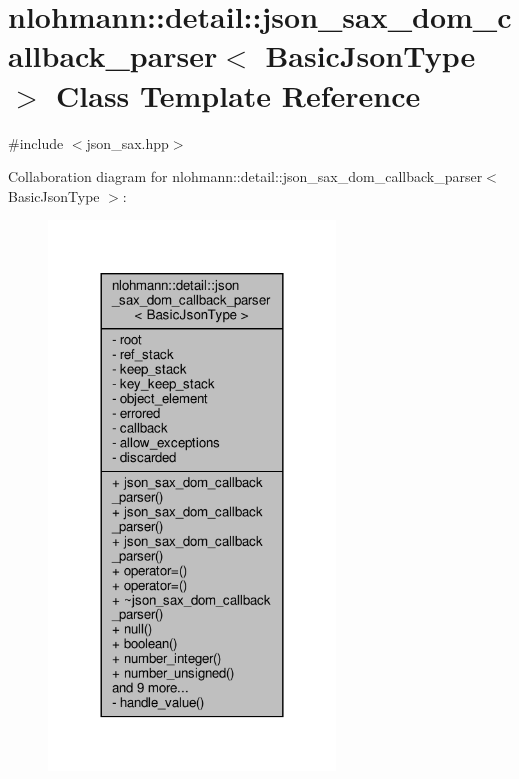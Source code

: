 \hypertarget{classnlohmann_1_1detail_1_1json__sax__dom__callback__parser}{}\section{nlohmann\+:\+:detail\+:\+:json\+\_\+sax\+\_\+dom\+\_\+callback\+\_\+parser$<$ Basic\+Json\+Type $>$ Class Template Reference}
\label{classnlohmann_1_1detail_1_1json__sax__dom__callback__parser}


{\ttfamily \#include $<$json\+\_\+sax.\+hpp$>$}



Collaboration diagram for nlohmann\+:\+:detail\+:\+:json\+\_\+sax\+\_\+dom\+\_\+callback\+\_\+parser$<$ Basic\+Json\+Type $>$\+:\nopagebreak
\begin{figure}[H]
\begin{center}
\leavevmode
\includegraphics[width=216pt]{classnlohmann_1_1detail_1_1json__sax__dom__callback__parser__coll__graph}
\end{center}
\end{figure}
